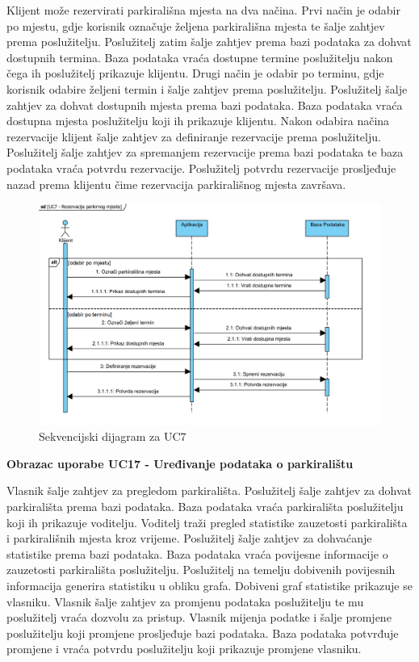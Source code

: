 				Klijent može rezervirati parkirališna mjesta na dva načina. Prvi način je odabir po mjestu, gdje korisnik označuje željena parkirališna mjesta te šalje zahtjev prema poslužitelju. Poslužitelj zatim šalje zahtjev prema bazi podataka za dohvat dostupnih termina. Baza podataka vraća dostupne termine poslužitelju nakon čega ih poslužitelj prikazuje klijentu. Drugi način je odabir po terminu, gdje korisnik odabire željeni termin i šalje zahtjev prema poslužitelju. Poslužitelj šalje zahtjev za dohvat dostupnih mjesta prema bazi podataka. Baza podataka vraća dostupna mjesta poslužitelju koji ih prikazuje klijentu. Nakon odabira načina rezervacije klijent šalje zahtjev za definiranje rezervacije prema poslužitelju. Poslužitelj šalje zahtjev za spremanjem rezervacije prema bazi podataka te baza podataka vraća potvrdu rezervacije. Poslužitelj potvrdu rezervacije prosljeđuje nazad prema klijentu čime rezervacija parkirališnog mjesta završava.
				  
				\vspace{1cm}
				
				\begin{figure}[H]
					\centering
					\includegraphics[width=\textwidth]{slike/SD_UC7.JPG} 
					\caption{Sekvencijski dijagram za UC7}
					\label{fig:promjene10} 
				\end{figure}
				
				\textbf {Obrazac uporabe UC17 - Uređivanje podataka o parkiralištu}
				
				\vspace{1cm}
				
				Vlasnik šalje zahtjev za pregledom parkirališta. Poslužitelj šalje zahtjev za dohvat parkirališta prema bazi podataka. Baza podataka vraća parkirališta poslužitelju koji ih prikazuje voditelju. Voditelj traži pregled statistike zauzetosti parkirališta i parkirališnih mjesta kroz vrijeme. Poslužitelj šalje zahtjev za dohvaćanje statistike prema bazi podataka. Baza podataka vraća povijesne informacije o zauzetosti parkirališta poslužitelju. Poslužitelj na temelju dobivenih povijesnih informacija generira statistiku u obliku grafa. Dobiveni graf statistike prikazuje se vlasniku. Vlasnik šalje zahtjev za promjenu podataka poslužitelju te mu poslužitelj vraća dozvolu za pristup. Vlasnik mijenja podatke i šalje promjene poslužitelju koji promjene prosljeđuje bazi podataka. Baza podataka potvrđuje promjene i vraća potvrdu poslužitelju koji prikazuje promjene vlasniku.
				
